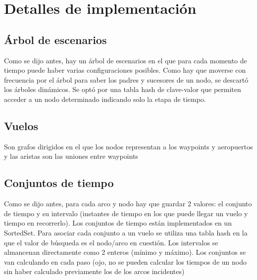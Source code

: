\section{Detalles de implementación}
\subsection{Árbol de escenarios}
Como se dijo antes, hay un árbol de escenarios en el que para cada momento de tiempo puede haber varias configuraciones posibles. Como hay que moverse con frecuencia por el árbol para saber los padres y sucesores de un nodo, se descartó los árboles dinámicos. Se optó por una tabla hash de clave-valor que permiten acceder a un nodo determinado indicando solo la etapa de tiempo.
\subsection{Vuelos}
Son grafos dirigidos en el que los nodos representan a los waypoints y aeropuertos y las aristas son las uniones entre waypoints
\subsection{Conjuntos de tiempo}
Como se dijo antes, para cada arco y nodo hay que guardar 2 valores: el conjunto de tiempo y su intervalo (instantes de tiempo en los que puede llegar un vuelo y tiempo en recorrerlo). Los conjuntos de tiempo están implementados en un SortedSet. Para asociar cada conjunto a un vuelo se utiliza una tabla hash en la que el valor de búsqueda es el nodo/arco en cuestión. Los intervalos se almancenan directamente como 2 enteros (mínimo y máximo). Los conjuntos se van calculando en cada paso (ojo, no se pueden calcular los tiempos de un nodo sin haber calculado previamente los de los arcos incidentes)
